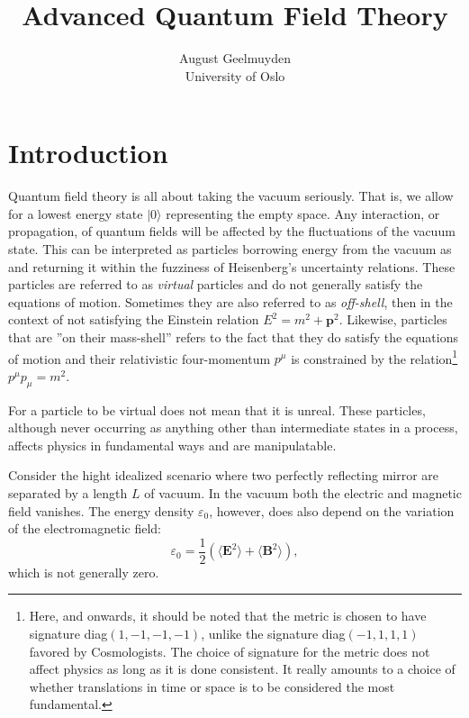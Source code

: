 \documentclass[twoside,utf8]{article}
\title{
\fontsize{22pt}{10pt}\selectfont
Advanced Quantum Field Theory } %
\author{
\large
August Geelmuyden
\\[2mm] %
\normalsize
University of Oslo \\ %
}
\date{}
\newcommand{\ket}[1] { |#1\rangle }
\newcommand{\expe}[1]{ \langle #1 \rangle }
\begin{document}
\maketitle %

%


\section{Introduction}
Quantum field theory is all about taking the vacuum seriously. That is, we allow for a lowest energy state $\ket{0}$ representing the empty space. Any interaction, or propagation, of quantum fields will be affected by the fluctuations of the vacuum state. This can be interpreted as particles borrowing energy from the vacuum as and returning it within the fuzziness of Heisenberg's uncertainty relations. These particles are referred to as {\it virtual} particles and do not generally satisfy the equations of motion. Sometimes they are also referred to as {\it off-shell}, then in the context of not satisfying the Einstein relation $E^2=m^2+\mathbf{p}^2$. Likewise, particles that are ''on their mass-shell'' refers to the fact that they do satisfy the equations of motion and their relativistic four-momentum $p^\mu$ is constrained by the relation\footnote{Here, and onwards, it should be noted that the metric is chosen to have signature diag$(1,-1,-1,-1)$, unlike the signature diag$(-1,1,1,1)$ favored by Cosmologists. The choice of signature for the metric does not affect physics as long as it is done consistent. It really amounts to a choice of whether translations in time or space is to be considered the most fundamental.  }
$p^\mu p_\mu = m^2$.

For a particle to be virtual does not mean that it is unreal. These particles, although never occurring as anything other than intermediate states in a process, affects physics in fundamental ways and are manipulatable.

Consider the hight idealized scenario where two perfectly reflecting mirror are separated by a length $L$ of vacuum. In the vacuum both the electric and magnetic field vanishes. The energy density $\varepsilon_0$, however, does also depend on the variation of the electromagnetic field:
\[
\varepsilon_0 = \frac{1}{2}\left( \expe{\mathbf{E}^2}+\expe{\mathbf{B}^2} \right),
\]
which is not generally zero.
\end{document}
